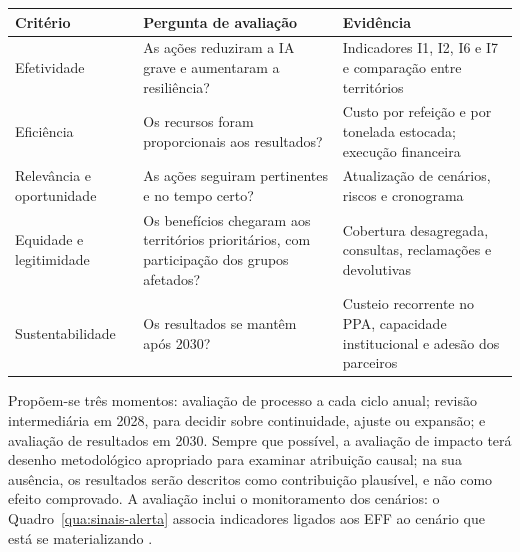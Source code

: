 \documentclass[
	12pt,				%
	openright,			%
	oneside,			%
	a4paper,			%
	chapter=TITLE,		%
	section=TITLE,		%
	english,			%
	french,				%
	spanish,			%
	brazil,				%
 ]{abntex2}
\begin{document}
\begin{quadro}[!htbp]
\centering
\caption{Critérios de avaliação e realimentação}
\label{qua:avaliacao-gestao}
\footnotesize
\renewcommand{\arraystretch}{1.05}
\setlength{\tabcolsep}{3pt}
\begin{tabularx}{\textwidth}{|>{\raggedright\arraybackslash}p{2.6cm}|>{\raggedright\arraybackslash}X|>{\raggedright\arraybackslash}p{5.2cm}|}
\hline
\textbf{Critério} & \textbf{Pergunta de avaliação} & \textbf{Evidência} \\
\hline
Efetividade & As ações reduziram a IA grave e aumentaram a resiliência? & Indicadores I1, I2, I6 e I7 e comparação entre territórios \\
\hline
Eficiência & Os recursos foram proporcionais aos resultados? & Custo por refeição e por tonelada estocada; execução financeira \\
\hline
Relevância e oportunidade & As ações seguiram pertinentes e no tempo certo? & Atualização de cenários, riscos e cronograma \\
\hline
Equidade e legitimidade & Os benefícios chegaram aos territórios prioritários, com participação dos grupos afetados? & Cobertura desagregada, consultas, reclamações e devolutivas \\
\hline
Sustentabilidade & Os resultados se mantêm após 2030? & Custeio recorrente no PPA, capacidade institucional e adesão dos parceiros \\
\hline
\end{tabularx}
\end{quadro}

Propõem-se três momentos: avaliação de processo a cada ciclo anual; revisão
intermediária em 2028, para decidir sobre continuidade, ajuste ou expansão; e
avaliação de resultados em 2030. Sempre que possível, a avaliação de impacto
terá desenho metodológico apropriado para examinar atribuição causal; na sua
ausência, os resultados serão descritos como contribuição plausível, e não como
efeito comprovado. A avaliação inclui o monitoramento dos cenários: o
Quadro~\ref{qua:sinais-alerta} associa indicadores ligados aos EFF ao cenário
que está se materializando \cite[cap. 7]{araujo_cenarios2026}.
\end{document}
